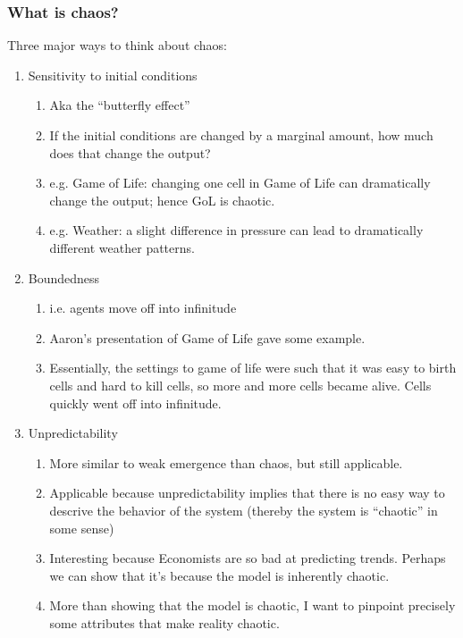 \documentclass[11pt, handout]{beamer}
\begin{document}
\begin{frame}
    \frametitle{What is chaos?}
    Three major ways to think about chaos:
    \begin{enumerate}
        \item Sensitivity to initial conditions
            \begin{enumerate}
                \item Aka the ``butterfly effect''
                \item If the initial conditions are changed by a marginal amount, how much does that change the output?
                \item e.g. Game of Life: changing one cell in Game of Life can dramatically change the output; hence GoL is chaotic.
                \item e.g. Weather: a slight difference in pressure can lead to dramatically different weather patterns.
            \end{enumerate}
        \item Boundedness 
            \begin{enumerate}
                \item i.e. agents move off into infinitude
                \item Aaron's presentation of Game of Life gave some example. 
                \item Essentially, the settings to game of life were such that it was easy to birth cells and hard to kill cells, so more and more cells became alive. Cells quickly went off into infinitude.
            \end{enumerate}
        \item Unpredictability
            \begin{enumerate}
                \item More similar to weak emergence than chaos, but still applicable.
                \item Applicable because unpredictability implies that there is no easy way to descrive the behavior of the system (thereby the system is ``chaotic'' in some sense)
                \item Interesting because Economists are so bad at predicting trends. Perhaps we can show that it's because the model is inherently chaotic.
                \item More than showing that the model is chaotic, I want to pinpoint precisely some attributes that make reality chaotic.
            \end{enumerate}
    \end{enumerate}
\end{frame}
\end{document}

